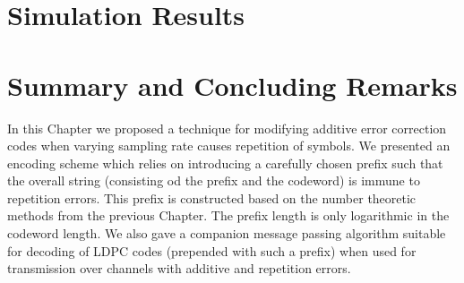 \section{Simulation Results}
\vspace{2in}
\section{Summary and Concluding Remarks}

In this Chapter we proposed a technique for modifying additive
error correction codes when varying sampling rate causes
repetition of symbols. We presented an encoding scheme which
relies on introducing a carefully chosen prefix such that the
overall string (consisting od the prefix and the codeword) is
immune to repetition errors. This prefix is constructed based on
the number theoretic methods from the previous Chapter. The prefix
length is only logarithmic in the codeword length. We also gave a
companion message passing algorithm suitable for decoding of LDPC
codes (prepended with such a prefix) when used for transmission
over channels with additive and repetition errors.

